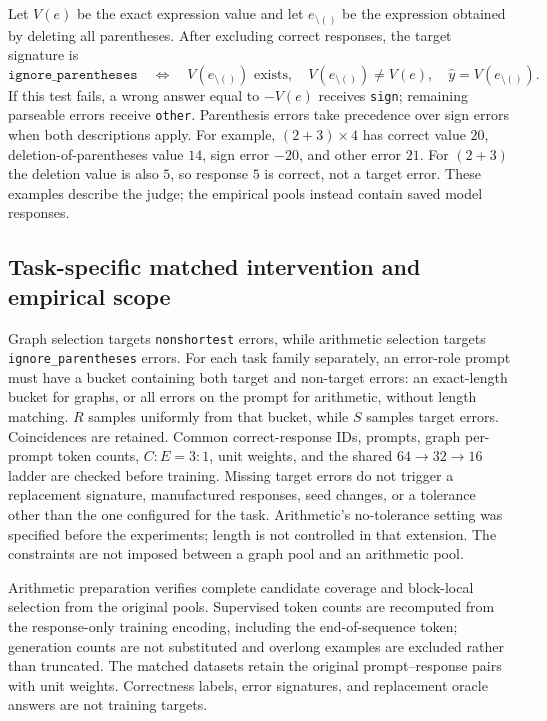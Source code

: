Let $V(e)$ be the exact expression value and let $e_{\setminus()}$ be the
expression obtained by deleting all parentheses. After excluding correct
responses, the target signature is
\[
 \texttt{ignore\_parentheses}
 \quad\Longleftrightarrow\quad
 V(e_{\setminus()})\text{ exists},\quad
 V(e_{\setminus()})\ne V(e),\quad \hat y=V(e_{\setminus()}).
\]
If this test fails, a wrong answer equal to $-V(e)$ receives \texttt{sign};
remaining parseable errors receive \texttt{other}. Parenthesis errors take
precedence over sign errors when both descriptions apply. For example,
$(2+3)\times4$ has correct value $20$, deletion-of-parentheses value $14$,
sign error $-20$, and other error $21$. For $(2+3)$ the deletion value is
also $5$, so response $5$ is correct, not a target error. These examples
describe the judge; the empirical pools instead contain saved model responses.

\subsection{Task-specific matched intervention and empirical scope}
Graph selection targets \texttt{nonshortest} errors, while arithmetic
selection targets \texttt{ignore\_parentheses} errors. For each
task family separately, an error-role prompt must have a bucket containing
both target and non-target errors: an exact-length bucket for graphs, or
all errors on the prompt for arithmetic, without length matching.
$R$ samples uniformly from that bucket, while $S$ samples target errors.
Coincidences are retained. Common correct-response IDs, prompts, graph
per-prompt token counts,
$C:E=3:1$, unit weights, and the shared $64\to32\to16$ ladder are checked
before training. Missing target errors do not trigger a replacement
signature, manufactured responses, seed changes, or a tolerance other than
the one configured for the task. Arithmetic's no-tolerance setting was
specified before the experiments; length is not controlled in that extension.
The constraints are not imposed between a graph pool and an arithmetic pool.

Arithmetic preparation verifies complete candidate coverage and block-local
selection from the original pools. Supervised token counts are recomputed
from the response-only training encoding, including the end-of-sequence
token; generation counts are not substituted and overlong examples are
excluded rather than truncated. The matched datasets retain the original
prompt--response pairs with unit weights. Correctness labels, error
signatures, and replacement oracle answers are not training targets.


